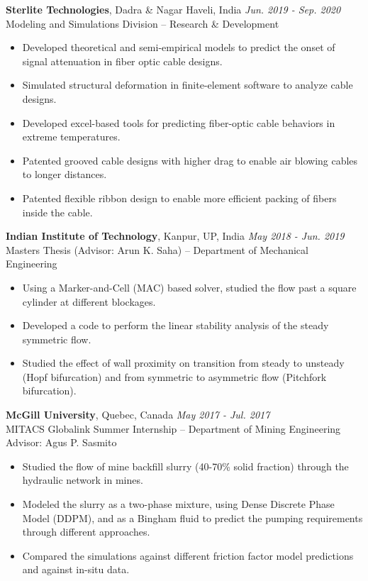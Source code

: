 \documentclass[11pt]{article}
\begin{document}
\vspace{4mm}

\noindent\textbf{Sterlite Technologies}, Dadra \& Nagar Haveli, India \hfill \textit{Jun. 2019 - Sep. 2020} \\
Modeling and Simulations Division – Research \& Development
\begin{itemize}[leftmargin=*,itemsep=1pt]
    \item Developed theoretical and semi-empirical models to predict the onset of signal attenuation in fiber optic cable designs.
    \item Simulated structural deformation in finite-element software to analyze cable designs.
    \item Developed excel-based tools for predicting fiber-optic cable behaviors in extreme temperatures.
    \item Patented grooved cable designs with higher drag to enable air blowing cables to longer distances.
    \item Patented flexible ribbon design to enable more efficient packing of fibers inside the cable.
\end{itemize}

\vspace{4mm}

\noindent\textbf{Indian Institute of Technology}, Kanpur, UP, India \hfill \textit{May 2018 - Jun. 2019} \\
Masters Thesis (Advisor: Arun K. Saha) – Department of Mechanical Engineering
\begin{itemize}[leftmargin=*,itemsep=1pt]
    \item Using a Marker-and-Cell (MAC) based solver, studied the flow past a square cylinder at different blockages.
    \item Developed a code to perform the linear stability analysis of the steady symmetric flow.
    \item Studied the effect of wall proximity on transition from steady to unsteady (Hopf bifurcation) and from symmetric to asymmetric flow (Pitchfork bifurcation).
\end{itemize}

\vspace{4mm}

\noindent\textbf{McGill University}, Quebec, Canada \hfill \textit{May 2017 - Jul. 2017} \\
MITACS Globalink Summer Internship – Department of Mining Engineering \\
Advisor: Agus P. Sasmito
\begin{itemize}[leftmargin=*,itemsep=1pt]
    \item Studied the flow of mine backfill slurry (40-70\% solid fraction) through the hydraulic network in mines.
    \item Modeled the slurry as a two-phase mixture, using Dense Discrete Phase Model (DDPM), and as a Bingham fluid to predict the pumping requirements through different approaches.
    \item Compared the simulations against different friction factor model predictions and against in-situ data.
\end{itemize}
\end{document}
